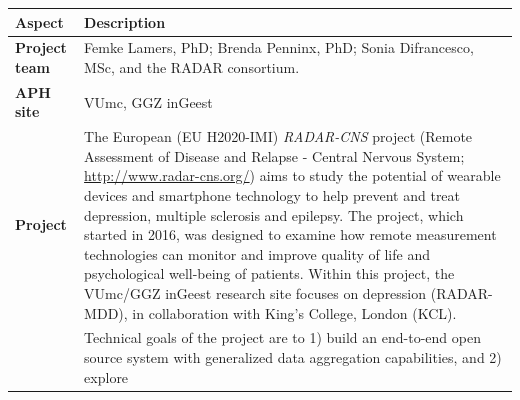 \documentclass[]{book}
\begin{document}
\begin{longtable}[]{@{}ll@{}}
\toprule
\begin{minipage}[b]{0.25\columnwidth}\raggedright\strut
\textbf{Aspect}\strut
\end{minipage} & \begin{minipage}[b]{0.69\columnwidth}\raggedright\strut
\textbf{Description}\strut
\end{minipage}\tabularnewline
\midrule
\endhead
\begin{minipage}[t]{0.25\columnwidth}\raggedright\strut
\textbf{Project team}\strut
\end{minipage} & \begin{minipage}[t]{0.69\columnwidth}\raggedright\strut
Femke Lamers, PhD; Brenda Penninx, PhD; Sonia Difrancesco, MSc, and the
RADAR consortium.\strut
\end{minipage}\tabularnewline
\begin{minipage}[t]{0.25\columnwidth}\raggedright\strut
\textbf{APH site}\strut
\end{minipage} & \begin{minipage}[t]{0.69\columnwidth}\raggedright\strut
VUmc, GGZ inGeest\strut
\end{minipage}\tabularnewline
\begin{minipage}[t]{0.25\columnwidth}\raggedright\strut
\textbf{Project}\strut
\end{minipage} & \begin{minipage}[t]{0.69\columnwidth}\raggedright\strut
The European (EU H2020-IMI) \emph{RADAR-CNS} project (Remote Assessment
of Disease and Relapse - Central Nervous System;
\url{http://www.radar-cns.org/}) aims to study the potential of wearable
devices and smartphone technology to help prevent and treat depression,
multiple sclerosis and epilepsy. The project, which started in 2016, was
designed to examine how remote measurement technologies can monitor and
improve quality of life and psychological well-being of patients. Within
this project, the VUmc/GGZ inGeest research site focuses on depression
(RADAR-MDD), in collaboration with King's College, London (KCL).\strut
\end{minipage}\tabularnewline
\begin{minipage}[t]{0.25\columnwidth}\raggedright\strut
\strut
\end{minipage} & \begin{minipage}[t]{0.69\columnwidth}\raggedright\strut
Technical goals of the project are to 1) build an end-to-end open source
system with generalized data aggregation capabilities, and 2) explore

\end{minipage}
\end{longtable}
\end{document}
